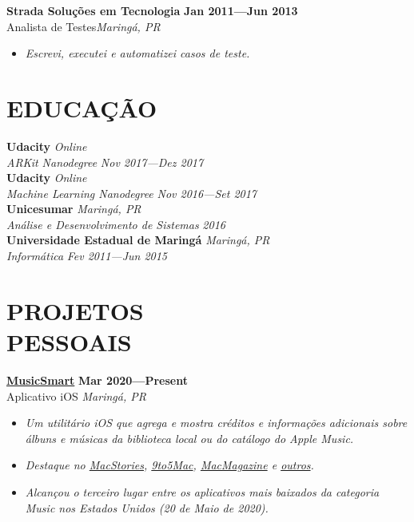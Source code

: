 \documentclass[line,margin]{res}
\begin{document}
\begin{resume}
  {\bf Strada Solu\c{c}\~oes em Tecnologia} \hfill {\bf Jan 2011---Jun 2013} \\
  Analista de Testes\hfill {\sl Maring\'a, PR}\\[-6pt]
    \begin{itemize}
    \item {\sl Escrevi, executei e automatizei casos de teste.}
  \end{itemize}


\section{EDUCAÇÃO}
  {\bf Udacity} \hfill {\sl Online} \\
  {\sl ARKit Nanodegree} \hfill {\sl Nov 2017---Dez 2017}\\[6pt]
  {\bf Udacity} \hfill {\sl Online} \\
  {\sl Machine Learning Nanodegree} \hfill {\sl Nov 2016---Set 2017}\\[6pt]
  {\bf Unicesumar} \hfill {\sl Maring\'a, PR} \\
  {\sl Análise e Desenvolvimento de Sistemas} \hfill {\sl 2016}\\[6pt]
  {\bf Universidade Estadual de Maringá} \hfill {\sl Maring\'a, PR} \\
  {\sl Informática} \hfill {\sl Fev 2011---Jun 2015}


\section{PROJETOS \\ PESSOAIS}
  {\bf \href{https://apps.apple.com/us/app/musicsmart/id1512195368}{MusicSmart}} \hfill {\bf Mar 2020---Present} \\
  Aplicativo iOS \hfill {\sl Maring\'a, PR}\\[-6pt]
    \begin{itemize}
    \item {\sl Um utilitário iOS que agrega e mostra créditos e informações adicionais sobre álbuns e músicas da biblioteca local ou do catálogo do Apple Music.}
    \item {\sl Destaque no \href{https://www.macstories.net/reviews/musicsmart-puts-the-spotlight-on-music-credits/}{MacStories}, \href{https://9to5mac.com/2020/05/19/musicsmart-apple-music-app/}{9to5Mac}, \href{https://macmagazine.uol.com.br/post/2020/05/21/aplicativo-brasileiro-musicsmart-traz-detalhes-aprofundados-sobre-as-cancoes-do-apple-music/}{MacMagazine} e \href{https://twitter.com/chockenberry/status/1262803700658999296}{outros}.}
    \item {\sl Alcançou o terceiro lugar entre os aplicativos mais baixados da categoria Music nos Estados Unidos (20 de Maio de 2020).}
    \end{itemize}


\end{resume}
\end{document}
